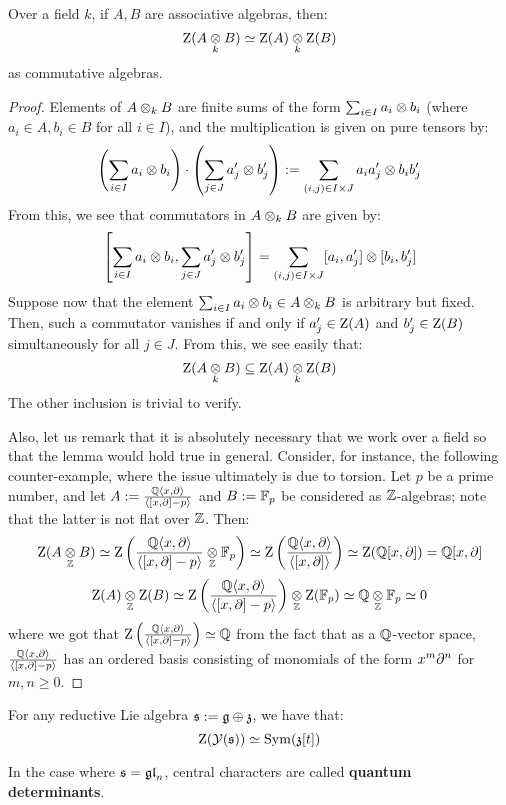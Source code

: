         \begin{lemma} \label{lemma: centres_of_tensor_products_of_algebras}
            Over a field $k$, if $A, B$ are associative algebras, then:
                $$\rmZ(A \tensor_k B) \cong \rmZ(A) \tensor_k \rmZ(B)$$
            as commutative algebras.
        \end{lemma}
            \begin{proof}
                Elements of $A \tensor_k B$ are finite sums of the form $\sum_{i \in I} a_i \tensor b_i$ (where $a_i \in A, b_i \in B$ for all $i \in I$), and the multiplication is given on pure tensors by:
                    $$\left( \sum_{i \in I} a_i \tensor b_i \right) \cdot \left( \sum_{j \in J} a'_j \tensor b'_j \right) := \sum_{(i, j) \in I \x J} a_i a'_j \tensor b_i b'_j$$
                From this, we see that commutators in $A \tensor_k B$ are given by:
                    $$\left[ \sum_{i \in I} a_i \tensor b_i, \sum_{j \in J} a'_j \tensor b'_j \right] = \sum_{(i, j) \in I \x J} [a_i, a'_j] \tensor [b_i, b'_j]$$
                Suppose now that the element $\sum_{i \in I} a_i \tensor b_i \in A \tensor_k B$ is arbitrary but fixed. Then, such a commutator vanishes if and only if $a'_j \in \mathrm{Z}(A)$ and $b'_j \in \mathrm{Z}(B)$ simultaneously for all $j \in J$. From this, we see easily that:
                    $$\rmZ(A \tensor_k B) \subseteq \rmZ(A) \tensor_k \rmZ(B)$$
                The other inclusion is trivial to verify.

                Also, let us remark that it is absolutely necessary that we work over a field so that the lemma would hold true in general. Consider, for instance, the following counter-example, where the issue ultimately is due to torsion. Let $p$ be a prime number, and let $A := \frac{\mathbb{Q}\langle x, \partial\rangle}{\langle[x, \partial] - p\rangle}$ and $B := \mathbb{F}_p$ be considered as $\mathbb{Z}$-algebras; note that the latter is not flat over $\mathbb{Z}$. Then:
                    $$\rmZ(A \tensor_{\Z} B) \cong \rmZ\left( \frac{\Q\<x, \del\>}{\<[x, \del] - p\>} \tensor_{\Z} \F_p \right) \cong \rmZ\left( \frac{\Q\<x, \del\>}{\<[x, \del]\>} \right) \cong \rmZ(\Q[x, \del]) = \Q[x, \del]$$
                    $$\rmZ(A) \tensor_{\Z} \rmZ(B) \cong \rmZ\left( \frac{\Q\<x, \del\>}{\<[x, \del] - p\>} \right) \tensor_{\Z} \rmZ(\F_p) \cong \Q \tensor_{\Z} \F_p \cong 0$$
                where we got that $\mathrm{Z}\left( \frac{\mathbb{Q}\langle x, \partial\rangle}{\langle[x, \partial] - p\rangle} \right) \simeq \mathbb{Q}$ from the fact that as a $\mathbb{Q}$-vector space, $\frac{\mathbb{Q}\langle x, \partial\rangle}{\langle[x, \partial] - p\rangle}$ has an ordered basis consisting of monomials of the form $x^m \partial^n$ for $m, n \geq 0$.
            \end{proof}
        \begin{corollary}
            For any reductive Lie algebra $\mathfrak{s} := \mathfrak{g} \oplus \mathfrak{z}$, we have that:
                $$\mathrm{Z}( \mathcal{Y}(\mathfrak{s}) ) \simeq \mathrm{Sym}(\mathfrak{z}[t])$$
        \end{corollary}
            
        \begin{definition} \label{def: quantum_determinants}
            In the case where $\mathfrak{s} = \mathfrak{gl}_n$, central characters are called \textbf{quantum determinants}.
        \end{definition}